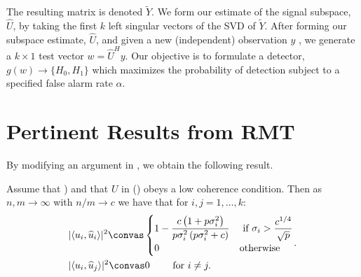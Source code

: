 The resulting matrix is denoted $\widetilde{Y}$. We form our estimate of the signal subspace, $\widehat{U}$, by taking the first $k$ left singular vectors of the SVD of $\widetilde{Y}$. After forming our subspace estimate, $\widehat{U}$,  and given a new (independent) observation $y$ \DIFaddbegin {}\DIFaddend , we generate a $k \times 1$ test vector $w=\widehat{U}^Hy$. Our objective is to formulate a detector, $g(w)\to\{H_0,H_1\}$ which maximizes the probability of detection subject to a specified false alarm rate  $\alpha$.

\section{Pertinent Results from RMT}\label{sec:rmt}

By modifying an argument in  \cite{benaych2011singular}, we obtain the following result.
\begin{Th}\label{th:angles}
Assume that \DIFdelbegin {}\DIFdelend \DIFaddbegin {}\DIFaddend ) and that $U$ in (\DIFdelbegin \DIFdel{\ref{eq:problem}}\DIFdelend \DIFaddbegin \DIFadd{\ref{eq:training_data}}\DIFaddend ) obeys a low coherence condition. Then as $n,m \longrightarrow \infty$ with $n/m \to c$ we have that for $i,j = 1, \ldots, k$:
\begin{equation*}
\begin{aligned}
&|\langle u_i,\widehat{u}_i\rangle|^2\convas
\begin{cases}
1-\dfrac{c\left(1+p\sigma_i^2\right)}{p\sigma_i^2\left(p\sigma_i^2 + c\right)} & \text{ if } \sigma_{i}>\dfrac{c^{1/4}}{\sqrt{p}}\\
0 & \textrm{otherwise}\\
\end{cases}\\
&|\langle u_i,\widehat{u}_j\rangle|^2\convas 0 \qquad \textrm{ for } i \neq j.\\
\end{aligned}.
\end{equation*}
\DIFaddbegin {}\DIFaddend \end{Th}

